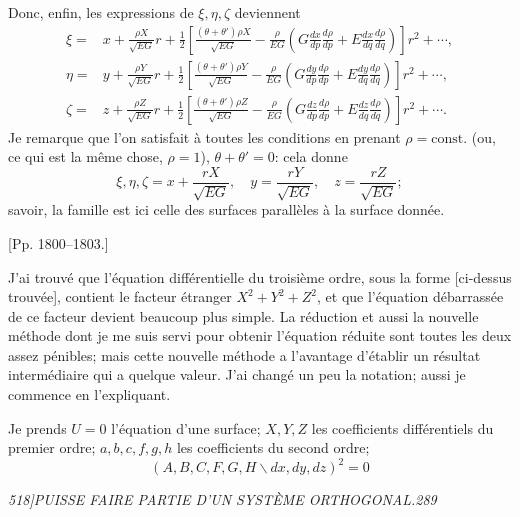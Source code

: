 \documentclass[11pt]{article}
\newcommand{\phead}[3]{\noindent\textit{#1\hfill #2\hfill #3}\par\medskip}
\newcommand{\qform}[2]{(#1\backslash #2)^2}
\begin{document}
Donc, enfin, les expressions de $\xi,\eta,\zeta$ deviennent
\[
\begin{split}
\xi={}&x+\frac{\rho X}{\sqrt{EG}}r
+\frac{1}{2}\left[\frac{(\theta+\theta')\rho X}{\sqrt{EG}}
-\frac{\rho}{EG}\left(G\frac{dx}{dp}\frac{d\rho}{dp}
+E\frac{dx}{dq}\frac{d\rho}{dq}\right)\right]r^2+\cdots,\\
\eta={}&y+\frac{\rho Y}{\sqrt{EG}}r
+\frac{1}{2}\left[\frac{(\theta+\theta')\rho Y}{\sqrt{EG}}
-\frac{\rho}{EG}\left(G\frac{dy}{dp}\frac{d\rho}{dp}
+E\frac{dy}{dq}\frac{d\rho}{dq}\right)\right]r^2+\cdots,\\
\zeta={}&z+\frac{\rho Z}{\sqrt{EG}}r
+\frac{1}{2}\left[\frac{(\theta+\theta')\rho Z}{\sqrt{EG}}
-\frac{\rho}{EG}\left(G\frac{dz}{dp}\frac{d\rho}{dp}
+E\frac{dz}{dq}\frac{d\rho}{dq}\right)\right]r^2+\cdots .
\end{split}
\]
Je remarque que l'on satisfait \`a toutes les conditions en prenant $\rho=\mathrm{const.}$
(ou, ce qui est la m\^eme chose, $\rho=1$), $\theta+\theta'=0$: cela donne
\[
\xi,\eta,\zeta=x+\frac{rX}{\sqrt{EG}},\quad y=\frac{rY}{\sqrt{EG}},\quad
z=\frac{rZ}{\sqrt{EG}};
\]
savoir, la famille est ici celle des surfaces parall\`eles \`a la surface donn\'ee.

\begin{center}[Pp. 1800--1803.]\end{center}

J'ai trouv\'e que l'\'equation diff\'erentielle du troisi\`eme ordre, sous la forme
[ci-dessus trouv\'ee], contient le facteur \'etranger $X^2+Y^2+Z^2$, et que
l'\'equation d\'ebarrass\'ee de ce facteur devient beaucoup plus simple. La r\'eduction
et aussi la nouvelle m\'ethode dont je me suis servi pour obtenir l'\'equation r\'eduite
sont toutes les deux assez p\'enibles; mais cette nouvelle m\'ethode a l'avantage
d'\'etablir un r\'esultat interm\'ediaire qui a quelque valeur. J'ai chang\'e un peu la
notation; aussi je commence en l'expliquant.

Je prends $U=0$ l'\'equation d'une surface; $X,Y,Z$ les coefficients diff\'erentiels du
premier ordre; $a,b,c,f,g,h$ les coefficients du second ordre;
\[
\qform{A,B,C,F,G,H}{dx,dy,dz}=0
\]

\clearpage

\phead{518]}{PUISSE FAIRE PARTIE D'UN SYST\`EME ORTHOGONAL.}{289}
\end{document}

